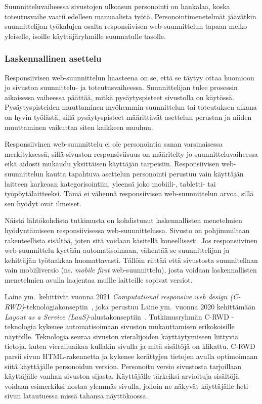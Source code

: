 \documentclass[finnish, 12pt, a4paper, elec, utf8, a-1b, online]{aaltothesis}
\begin{document}
Suunnitteluvaiheessa sivustojen ulkoasun personointi on hankalaa, koska
toteutusvaihe vaatii edelleen manuaalista työtä. Personointimenetelmät jäävätkin
suunnittelijan työkalujen osalta responsiivisen web-suunnittelun tapaan melko
yleiselle, isoille käyttäjäryhmille suunnatulle tasolle.

\subsubsection{Laskennallinen asettelu}

Responsiivisen web-suunnittelun haasteena on se, että se täytyy ottaa huomioon
jo sivuston suunnittelu- ja toteutusvaiheessa. Suunnittelijan tulee prosessin
aikaisessa vaiheessa päättää, mitkä pysäytyspisteet sivustolla on käytössä.
Pysäytyspisteiden muuttaminen myöhemmin suunnittelun tai toteutuksen aikana on
hyvin työlästä, sillä pysäytyspisteet määrittävät asettelun perustan ja niiden
muuttaminen vaikuttaa siten kaikkeen muuhun.

Responsiivinen web-suunnittelu ei ole personointia sanan varsinaisessa
merkityksessä, sillä sivuston responsiviisuus on määritelty jo
suunnitteluvaiheessa eikä aidosti mukaudu yksittäisen käyttäjän tarpeisiin.
Responsiivisen web-suunnittelun kautta tapahtuva asettelun personointi perustuu
vain käyttäjän laitteen karkeaan kategorisointiin, yleensä joko mobiili-,
tabletti- tai työpöytälaitteeksi. Tämä ei vähennä responsiivisen
web-suunnittelun arvoa, sillä sen hyödyt ovat ilmeiset.

Näistä lähtökohdista tutkimusta on kohdistunut laskennallisten menetelmien
hyödyntämiseen responsiivisessa web-suunnittelussa. Sivusto on pohjimmiltaan
rakenteellista sisältöä, joten sitä voidaan käsitellä koneellisesti. Jos
responsiivinen web-suunnittelu kyetään automatisoimaan, vähentää se
suunnittelijan ja kehittäjän työtaakkaa huomattavasti. Tällöin riittää että
sivustosta suunnitellaan vain mobiiliversio (ns. \textit{mobile first}
web-suunnittelu), josta voidaan laskennallisten menetelmien avulla laajentaa
muille laitteille sopivat versiot.

Laine ym.~kehittivät vuonna 2021 \textit{Computational responsive web design
    (C-RWD)}-teknologiakonseptin~\cite{laine2021responsive}, joka perustuu Laine
    ym.~vuonna 2020 kehittämään \textit{Layout as a Service
    (LaaS)}-alustakonseptiin~\cite{laine2020_laas}. Tutkimusryhmän C-RWD
    -teknologia kykenee automatisoimaan sivuston mukauttamisen erikokoisille
    näytöille. Teknologia seuraa sivuston vieralijoiden käyttäytymiseen
    liittyviä tietoja, kuten vierailuaikaa kullakin sivulla ja mitä sisältöjä on
    klikattu. C-RWD parsii sivun HTML-rakennetta ja kykenee kerättyjen tietojen
    avulla optimoimaan siitä käyttäjälle personoidun version. Personoitu versio
    sivustosta tarjoillaan käyttäjälle vanhan sivuston sijasta. Käyttäjälle
    tärkeiksi arvioituja sisältöjä voidaan esimerkiksi nostaa ylemmäs sivulla,
    jolloin ne näkyvät käyttäjälle heti sivun latautuessa missä tahansa
    näyttökoossa.
\end{document}

